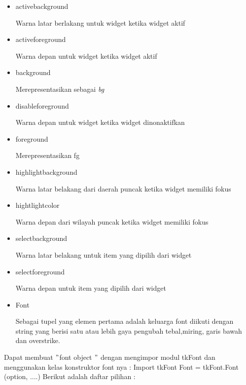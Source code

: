 \begin{itemize}
\item activebackground 

Warna latar berlakang untuk widget ketika widget aktif 
\item activeforeground 

Warna depan untuk widget ketika widget aktif 
\item background 

Merepresentasikan sebagai \textit{bg} 
\item disableforeground 

Warna depan untuk widget ketika widget dinonaktifkan 
\item foreground 

Merepresentasikan fg 
\item highlightbackground 

Warna latar belakang dari daerah puncak ketika widget memiliki fokus 
\item hightlightcolor 

Warna depan dari wilayah puncak ketika widget memiliki fokus 
\item selectbackground 

Warna latar belakang untuk item yang dipilih dari widget 
\item selectforeground 

Warna depan untuk item yang dipilih dari widget 
\item Font 
 
Sebagai tupel yang elemen pertama adalah keluarga font diikuti dengan string yang berisi satu atau lebih gaya pengubah tebal,miring, garis bawah dan overstrike. 
\end{itemize}
 
\vspace{12pt}
\hspace*{0.5in} Dapat membuat  $ " $font object $ " $ dengan mengimpor modul tkFont dan menggunakan kelas konstruktor font nya : 
Import tkFont 
Font = tkFont.Font (option, ....) 
\vspace{12pt}
Berikut adalah daftar pilihan : 
 
